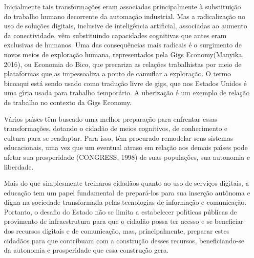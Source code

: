 \documentclass[
12pt,		%
openright,	%
twoside,  %
a4paper,			%
chapter=TITLE,		%
english,			%
french,				%
spanish,			%
brazil				%
]{USPSC-classe/USPSC}
\begin{document}
Inicialmente tais transforma\c{c}\~oes eram associadas principalmente \`a substitui\c{c}\~ao do trabalho humano decorrente da automa\c{c}\~ao industrial. Mas a radicaliza\c{c}\~ao no uso de solu\c{c}\~oes digitais, inclusive de intelig\^encia artificial, associadas ao aumento da conectividade, v\^em substituindo capacidades \textquotedbl cognitivas que antes eram exclusivas de humanos\textquotedbl [4 XXX]. Uma das consequ\^encias mais radicais \'e o surgimento de novos meios de explora\c{c}\~ao humana, representados pela \textquotedbl Gigs Economy\textquotedbl   (Manyika, 2016), ou \textquotedbl Economia do Bico\textquotedbl , que precariza as rela\c{c}\~oes trabalhistas por meio de plataformas que as impessoaliza a ponto de camuflar a explora\c{c}\~ao. O termo \textquotedbl bico\textquotedbl  aqui est\'a sendo usado como tradu\c{c}\~ao livre de \textquotedbl gigs\textquotedbl , que nos Estados Unidos \'e uma g\'{\i}ria usada para trabalho tempor\'ario. A uberiza\c{c}\~ao \'e um exemplo de rela\c{c}\~ao de trabalho no contexto da Gigs Economy.

















V\'arios pa\'{\i}ses t\^em buscado uma melhor prepara\c{c}\~ao para enfrentar essas transforma\c{c}\~oes, dotando o cidad\~ao de meios cognitivos, de conhecimento e cultura para se readaptar. Para isso, t\^em procurado remodelar seus sistemas educacionais, uma vez que um eventual atraso em rela\c{c}\~ao aos demais pa\'{\i}ses pode afetar sua prosperidade (CONGRESS, 1998)  de suas popula\c{c}\~oes, sua autonomia e liberdade.

















Mais do que simplesmente \textquotedbl treinar\textquotedbl  os cidad\~aos quanto ao uso  de servi\c{c}os digitais, a educa\c{c}\~ao tem um papel fundamental de prepar\'a-los para sua inser\c{c}\~ao aut\^onoma e digna na sociedade transformada pelas tecnologias de informa\c{c}\~ao e comunica\c{c}\~ao. Portanto, o desafio do Estado n\~ao se limita a estabelecer pol\'{\i}ticas p\'ublicas de provimento de infraestrutura para que o cidad\~ao possa ter acesso e se beneficiar dos recursos digitais e de comunica\c{c}\~ao, mas, principalmente, preparar estes cidad\~aos para que contribuam com a  constru\c{c}\~ao desses recursos, beneficiando-se da autonomia e prosperidade que  essa constru\c{c}\~ao gera.
\end{document}
